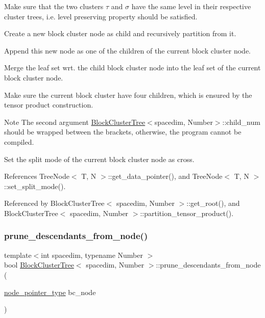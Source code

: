 Make sure that the two clusters $\tau$ and $\sigma$ have the same level in their respective cluster trees, i.\+e. level preserving property should be satisfied.

Create a new block cluster node as child and recursively partition from it.

Append this new node as one of the children of the current block cluster node.

Merge the leaf set wrt. the child block cluster node into the leaf set of the current block cluster node.

Make sure the current block cluster have four children, which is ensured by the tensor product construction.


\begin{DoxyDescription}
\item[Note ]The second argument {\ttfamily \hyperlink{classBlockClusterTree}{Block\+Cluster\+Tree}$<$spacedim}, Number$>$\+::child\+\_\+num should be wrapped between the brackets, otherwise, the program cannot be compiled. 
\end{DoxyDescription}

Set the split mode of the current block cluster node as cross.

References Tree\+Node$<$ T, N $>$\+::get\+\_\+data\+\_\+pointer(), and Tree\+Node$<$ T, N $>$\+::set\+\_\+split\+\_\+mode().



Referenced by Block\+Cluster\+Tree$<$ spacedim, Number $>$\+::get\+\_\+root(), and Block\+Cluster\+Tree$<$ spacedim, Number $>$\+::partition\+\_\+tensor\+\_\+product().

\mbox{\label{classBlockClusterTree_a6fd771b68a4c7195151f6dc02e8ec7e9}} 
\subsubsection{\texorpdfstring{prune\+\_\+descendants\+\_\+from\+\_\+node()}{prune\_descendants\_from\_node()}}
{\footnotesize\ttfamily template$<$int spacedim, typename Number $>$ \\
bool \hyperlink{classBlockClusterTree}{Block\+Cluster\+Tree}$<$ spacedim, Number $>$\+::prune\+\_\+descendants\+\_\+from\+\_\+node (\begin{DoxyParamCaption}\item[{\hyperlink{classTreeNode}{node\+\_\+pointer\+\_\+type}}]{bc\+\_\+node }\end{DoxyParamCaption})}

